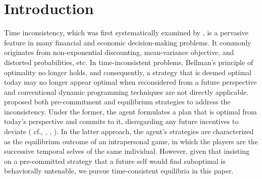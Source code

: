 \documentclass[11pt,reqno]{article}%
\numberwithin{equation}{section}
\begin{document}
\section{Introduction}\label{Introduction}
Time inconsistency, which was first systematically examined by \citet{samuelson1037anote}, is a pervasive feature in many financial and economic decision-making problems. It commonly originates from non-exponential discounting, mean-variance objective, and distorted probabilities, etc. In time-inconsistent problems, Bellman's principle of optimality no longer holds, and consequently, a strategy that is deemed optimal today may no longer appear optimal when reconsidered from a future perspective and conventional dynamic programming techniques are not directly applicable. \citet{strotz1955myopia} proposed both pre-commitment and equilibrium strategies to address the inconsistency. Under the former, the agent formulates a plan that is optimal from today's perspective and commits to it, disregarding any future incentives to deviate ( cf.\citet{BajeuxBesnainou1998}, \citet{li2000optimal}, \citet{richardson1989amin}, \citet{zhou2000continuous}). In the latter approach, the agent's strategies are characterized as the equilibrium outcome of an intrapersonal game, in which the players are the successive temporal selves of the same individual. However, given that insisting on a pre-committed strategy that a future self would find suboptimal is behaviorally untenable, we pursue time-consistent equilibria in this paper.
\end{document}
